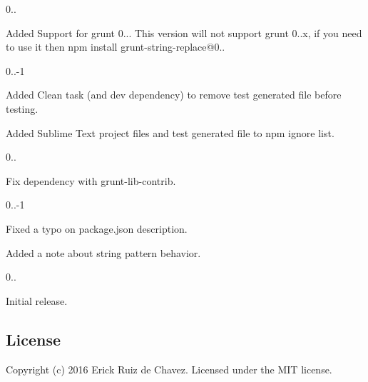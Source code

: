 0..
\begin{DoxyItemize}
\item Added Support for grunt 0... This version will not support grunt 0..\+x, if you need to use it then {\ttfamily npm install grunt-\/string-\/replace@0.}.
\end{DoxyItemize}

0..-\/1
\begin{DoxyItemize}
\item Added Clean task (and dev dependency) to remove test generated file before testing.
\item Added Sublime Text project files and test generated file to npm ignore list.
\end{DoxyItemize}

0..
\begin{DoxyItemize}
\item Fix dependency with grunt-\/lib-\/contrib.
\end{DoxyItemize}

0..-\/1
\begin{DoxyItemize}
\item Fixed a typo on package.\+json description.
\item Added a note about string pattern behavior.
\end{DoxyItemize}

0..
\begin{DoxyItemize}
\item Initial release.
\end{DoxyItemize}

\subsection*{License}

Copyright (c) 2016 Erick Ruiz de Chavez. Licensed under the M\+IT license. 
